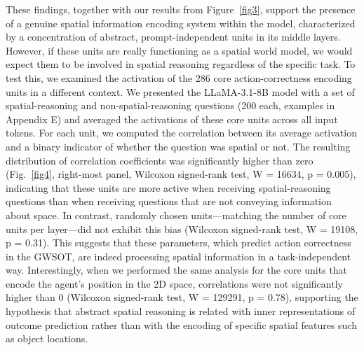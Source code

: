 \documentclass[runningheads]{llncs}
\begin{document}
These findings, together with our results from Figure~\ref{fig3}, support the presence of a genuine spatial information encoding system within the model, characterized by a concentration of abstract, prompt-independent units in its middle layers. However, if these units are really functioning as a spatial world model, we would expect them to be involved in spatial reasoning regardless of the specific task. To test this, we examined the activation of the 286 core action-correctness encoding units in a different context. We presented the LLaMA-3.1-8B model with a set of spatial-reasoning and non-spatial-reasoning questions (200 each, examples in Appendix E) and averaged the activations of these core units across all input tokens. For each unit, we computed the correlation between its average activation and a binary indicator of whether the question was spatial or not. The resulting distribution of correlation coefficients was significantly higher than zero (Fig.~\ref{fig4}, right-most panel, Wilcoxon signed-rank test, W = 16634, p = 0.005), indicating that these units are more active when receiving spatial-reasoning questions than when receiving questions that are not conveying information about space. In contrast, randomly chosen units—matching the number of core units per layer—did not exhibit this bias (Wilcoxon signed-rank test, W = 19108, p = 0.31). This suggests that these parameters, which predict action correctness in the GWSOT, are indeed processing spatial information in a task-independent way. Interestingly, when we performed the same analysis for the core units that encode the agent's position in the 2D space, correlations were not significantly higher than 0 (Wilcoxon signed-rank test, W = 129291, p = 0.78), supporting the hypothesis that abstract spatial reasoning is related with inner representations of outcome prediction rather than with the encoding of specific spatial features such as object locations.
\end{document}
